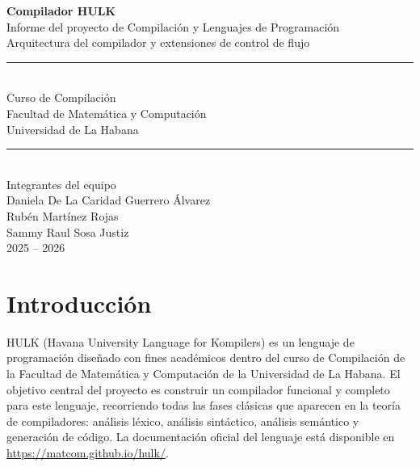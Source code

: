\documentclass[11pt,a4paper]{article}
\begin{document}
\begin{titlepage}
  \centering
  \vspace*{2cm}

  {\Huge\bfseries\color{hulkblue} Compilador HULK}\\[0.5cm]
  {\large\color{gray} Informe del proyecto de Compilación y Lenguajes de Programación}\\[0.3cm]
  {\normalsize\color{gray} Arquitectura del compilador y extensiones de control de flujo}\\[2.2cm]

  {\color{hulkblue}\rule{\linewidth}{2pt}}\\[0.4cm]
  {\large Curso de Compilación}\\[0.2cm]
  {\normalsize Facultad de Matemática y Computación}\\[0.1cm]
  {\normalsize Universidad de La Habana}\\[0.4cm]
  {\color{hulkblue}\rule{\linewidth}{2pt}}\\[3cm]

  {\large Integrantes del equipo}\\[1cm]
  {\large Daniela De La Caridad Guerrero Álvarez}\\[0.4cm]
  {\large Rubén Martínez Rojas}\\[0.4cm]
  {\large Sammy Raul Sosa Justiz}\\[3.5cm]

  {\normalsize\color{gray} 2025 -- 2026}
\end{titlepage}

\tableofcontents
\newpage

\section{Introducción}

HULK (Havana University Language for Kompilers) es un lenguaje de programación diseñado con fines académicos dentro del curso de Compilación de la Facultad de Matemática y Computación de la Universidad de La Habana. El objetivo central del proyecto es construir un compilador funcional y completo para este lenguaje, recorriendo todas las fases clásicas que aparecen en la teoría de compiladores: análisis léxico, análisis sintáctico, análisis semántico y generación de código. La documentación oficial del lenguaje está disponible en \url{https://matcom.github.io/hulk/}.
\end{document}
